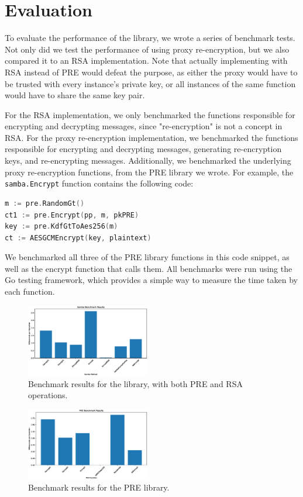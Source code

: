 \section{Evaluation}
\label{sec:evaluation}
To evaluate the performance of the \SystemName library, we wrote a series of benchmark tests.
Not only did we test the performance of \SystemName using proxy re-encryption, but we also compared it to an RSA implementation.
Note that actually implementing \SystemName with RSA instead of PRE would defeat the purpose, as either the proxy would have to be trusted with every instance's private key, or all instances of the same function would have to share the same key pair.

For the RSA implementation, we only benchmarked the \SystemName functions responsible for encrypting and decrypting messages, since "re-encryption" is not a concept in RSA.
For the proxy re-encryption implementation, we benchmarked the \SystemName functions responsible for encrypting and decrypting messages, generating re-encryption keys, and re-encrypting messages.
Additionally, we benchmarked the underlying proxy re-encryption functions, from the PRE library we wrote.
For example, the \texttt{samba.Encrypt} function contains the following code:
\begin{lstlisting}[language=Go]
m := pre.RandomGt()
ct1 := pre.Encrypt(pp, m, pkPRE)
key := pre.KdfGtToAes256(m)
ct := AESGCMEncrypt(key, plaintext)
\end{lstlisting}
We benchmarked all three of the PRE library functions in this code snippet, as well as the \SystemName encrypt function that calls them.
All benchmarks were run using the Go testing framework, which provides a simple way to measure the time taken by each function.

\begin{figure}
	\centering
	\includegraphics[width=0.48\textwidth]{figs/samba-bench}
	\caption{Benchmark results for the \SystemName library, with both PRE and RSA operations.}
	\label{fig:samba-bench}
\end{figure}

\begin{figure}
	\centering
	\includegraphics[width=0.48\textwidth]{figs/pre-bench}
	\caption{Benchmark results for the PRE library.}
	\label{fig:pre-bench}
\end{figure}


